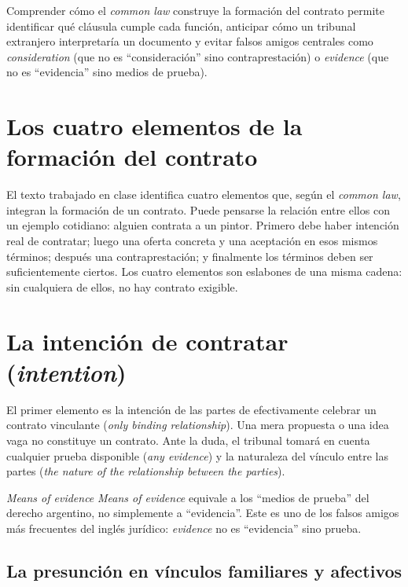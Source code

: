 \documentclass[12pt,oneside]{book}
\begin{document}
\begin{important}
Comprender cómo el \textit{common law} construye la formación del contrato permite identificar qué cláusula cumple cada función, anticipar cómo un tribunal extranjero interpretaría un documento y evitar falsos amigos centrales como \textit{consideration} (que no es ``consideración'' sino contraprestación) o \textit{evidence} (que no es ``evidencia'' sino medios de prueba).
\end{important}

\section{Los cuatro elementos de la formación del contrato}

El texto trabajado en clase identifica cuatro elementos que, según el \textit{common law}, integran la formación de un contrato. Puede pensarse la relación entre ellos con un ejemplo cotidiano: alguien contrata a un pintor. Primero debe haber intención real de contratar; luego una oferta concreta y una aceptación en esos mismos términos; después una contraprestación; y finalmente los términos deben ser suficientemente ciertos. Los cuatro elementos son eslabones de una misma cadena: sin cualquiera de ellos, no hay contrato exigible.

\section{La intención de contratar (\textit{intention})}

El primer elemento es la intención de las partes de efectivamente celebrar un contrato vinculante (\textit{only binding relationship}). Una mera propuesta o una idea vaga no constituye un contrato. Ante la duda, el tribunal tomará en cuenta cualquier prueba disponible (\textit{any evidence}) y la naturaleza del vínculo entre las partes (\textit{the nature of the relationship between the parties}).

\begin{definition}{\textit{Means of evidence}}
\textit{Means of evidence} equivale a los ``medios de prueba'' del derecho argentino, no simplemente a ``evidencia''. Este es uno de los falsos amigos más frecuentes del inglés jurídico: \textit{evidence} no es ``evidencia'' sino prueba.
\end{definition}

\subsection{La presunción en vínculos familiares y afectivos}
\end{document}
